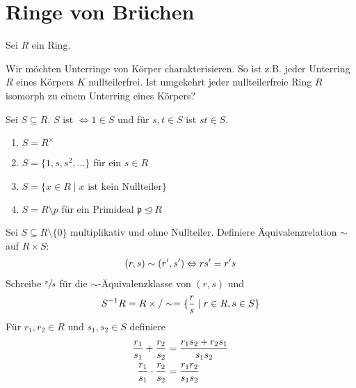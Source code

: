 \section{Ringe von Brüchen}

Sei $R$ ein Ring.

\begin{remark}
	Wir möchten Unterringe von Körper charakterisieren. So ist z.B. jeder Unterring $R$ eines Körpers $K$ nullteilerfrei. Ist umgekehrt jeder nullteilerfreie Ring $R$ isomorph zu einem Unterring eines Körpers?
\end{remark}

\begin{definition}[multiplikativ]
	Sei $S \subseteq R$. $S$ ist  $\Leftrightarrow 1 \in S$ und für $s,t \in S$ ist $st \in S$. 
\end{definition}

\begin{example}
	\begin{enumerate}
		\item $S = R^{\times}$
		\item $S = \{ 1, s, s^2, \dots \}$ für ein $s \in R$
		\item $S = \{ x \in R \mid x \text{ ist kein Nullteiler} \}$
		\item $S = R \setminus p$ für ein Primideal $\mathfrak{p} \unlhd R$
	\end{enumerate}
\end{example}

\begin{definition}
	Sei $S \subseteq R\setminus \{0\}$ multiplikativ und ohne Nullteiler. Definiere Äquivalenzrelation $\sim$ auf $R \times S$:
	\begin{align}
		(r,s) \sim (r', s') \Leftrightarrow r s' = r's\notag 
	\end{align}
	Schreibe $\sfrac{r}{s}$ für die $\sim$-Äquivalenzklasse von $(r,s)$ und 
	\begin{align}
		S^{-1}R = R \times / \sim = \{ \frac{r}{s} \mid r \in R,s \in S\}\notag	
	\end{align}
	Für $r_1,r_2 \in R$ und $s_1, s_2 \in S$ definiere
	\begin{align}
		\frac{r_1}{s_1} + \frac{r_2}{s_2} &= \frac{r_1 s_2 + r_2 s_1}{s_1 s_2} \notag \\
		\frac{r_1}{s_1} \cdot \frac{r_2}{s_2} &= \frac{r_1 r_2}{s_1 s_2} \notag
	\end{align}
\end{definition}

